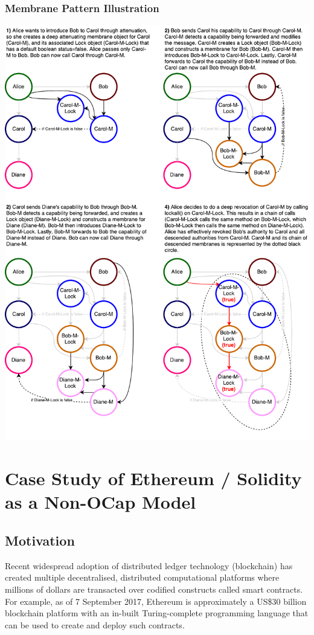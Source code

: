 \documentclass[a4paper,11pt,twoside]{article}
\begin{document}
{\begin{minipage}{\textwidth}
\subsubsection{Membrane Pattern Illustration}\label{sec:figmem}
\centering
\includegraphics[width=1.05\textwidth]{figures/Membrane.pdf}
   \label{fig:figmem}
\end{minipage}
\clearpage



\section{Case Study of Ethereum / Solidity as a Non-OCap Model}\label{sec:ethereum}

\subsection{Motivation}
Recent widespread adoption of distributed ledger technology (blockchain) has created multiple decentralised, distributed computational platforms where millions of dollars are transacted over codified constructs called smart contracts. For example, as of 7 September 2017, Ethereum\cite{wood2014} is approximately a US\$30 billion blockchain platform with an in-built Turing-complete programming language that can be used to create and deploy such contracts.

}
\end{document}
